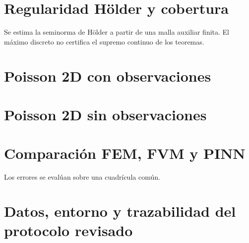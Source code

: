\section{Regularidad Hölder y cobertura}
\label{app:experimento9}
Se estima la seminorma de H\"older a partir de una malla auxiliar finita. El máximo discreto no certifica el supremo continuo de los teoremas.



\section{Poisson 2D con observaciones}
\label{app:experimento10}


\section{Poisson 2D sin observaciones}
\label{app:experimento11}


\section{Comparación FEM, FVM y PINN}
\label{app:experimento12}
Los errores se evalúan sobre una cuadrícula común.





\section{Datos, entorno y trazabilidad del protocolo revisado}
\label{app:protocolo_revisado}

